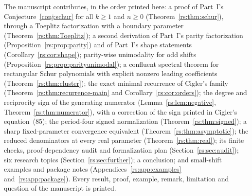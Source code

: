 \documentclass[11pt]{article}
\theoremstyle{definition}
\theoremstyle{remark}
\theoremstyle{definition}
\theoremstyle{plain}
\numberwithin{equation}{section}
\begin{document}
The manuscript contributes, in the order printed here: a proof of Part~I's
Conjecture~\ref{conj:schur} for all $k\ge1$ and $n\ge0$
(Theorem~\ref{rs:thm:schur}), through a Toeplitz factorization with a
boundary parameter (Theorem~\ref{rs:thm:Toeplitz}); a second derivation of
Part~I's parity factorization (Proposition~\ref{rs:prop:parity}) and of
Part~I's shape statements (Corollary~\ref{rs:cor:shape}); parity-wise
unimodality for odd shifts (Proposition~\ref{rs:prop:parityunimodal}); a
confluent spectral theorem for rectangular Schur polynomials with explicit
nonzero leading coefficients (Theorem~\ref{rs:thm:cluster}); the exact
minimal recurrence of Cigler's family (Theorem~\ref{rs:thm:recurrence-main}
and Corollary~\ref{rs:cor:orders}); the degree and reciprocity sign of the
generating numerator (Lemma~\ref{rs:lem:negative},
Theorem~\ref{rs:thm:numerator}), with a correction of the sign printed in
Cigler's equation~(85); the period-four signed normalization
(Theorem~\ref{rs:thm:signed}); a sharp fixed-parameter convergence
equivalent (Theorem~\ref{rs:thm:asymptotic}); the reduced denominators at
every real parameter (Theorem~\ref{rs:thm:real}); its finite checks,
proof-dependency audit and formalization plan
(Section~\ref{rs:sec:audit}); six research topics
(Section~\ref{rs:sec:further}); a conclusion; and small-shift examples and
package notes (Appendices~\ref{rs:app:examples} and~\ref{rs:app:package}).
Every result, proof, example, remark, limitation and question of the
manuscript is printed.
\end{document}
